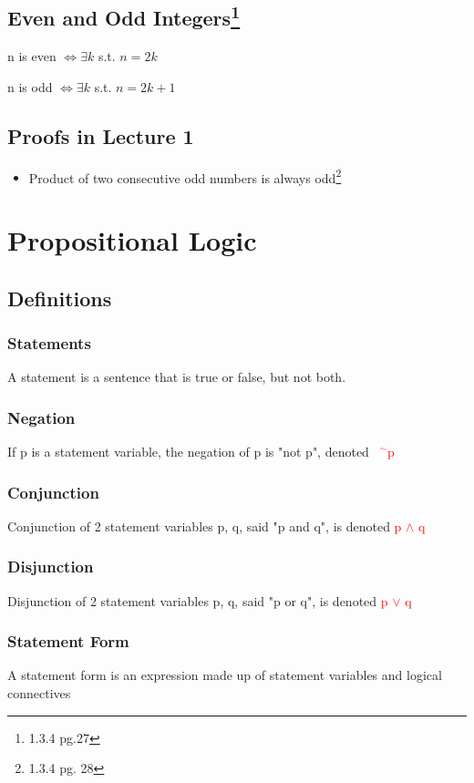 \documentclass{article}
\newcommand{\negation}{${\phantom{0}}^\sim$}
\begin{document}
\subsection[Even and Odd Integers]{Even and Odd Integers\footnote{1.3.4 pg.27}}
\quad n is even $\Leftrightarrow \exists k$ s.t. $n = 2k$

\quad n is odd $\Leftrightarrow \exists k$ s.t. $n = 2k+1$

\subsection{Proofs in Lecture 1}
\begin{itemize}
    \item Product of two consecutive odd numbers is always odd\footnote{1.3.4 pg. 28}
\end{itemize}

\section{Propositional Logic}
\subsection{Definitions}
\subsubsection{Statements}
A statement is a sentence that is true or false, but not both.
\subsubsection{Negation}
If p is a statement variable, the negation of p is "not p", denoted \textcolor{red}{\negation p}
\subsubsection{Conjunction}
Conjunction of 2 statement variables p, q, said "p and q", is denoted \textcolor{red}{p $\wedge$ q}
\subsubsection{Disjunction}
Disjunction of 2 statement variables p, q, said "p or q", is denoted \textcolor{red}{p $\vee$ q}
\subsubsection{Statement Form}
A statement form is an expression made up of statement variables and logical connectives
\end{document}
